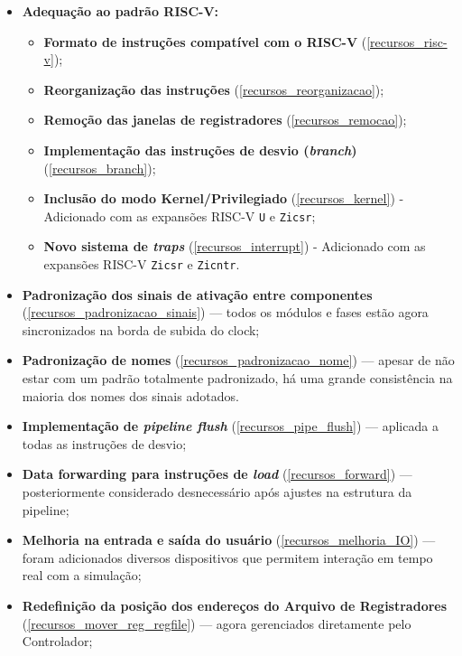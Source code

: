 \documentclass[
	12pt,				%
	openright,			%
	oneside,			%
	a4paper,			%
	english,			%
	french,				%
	spanish,			%
	brazil,				%
	]{abntex2}
\begin{document}
\begin{itemize}
    \item \textbf{Adequação ao padrão RISC-V:}
    \begin{itemize}
        \item \textbf{Formato de instruções compatível com o RISC-V} (\ref{recursos_risc-v});
        \item \textbf{Reorganização das instruções} (\ref{recursos_reorganizacao});
        \item \textbf{Remoção das janelas de registradores} (\ref{recursos_remocao});
        \item \textbf{Implementação das instruções de desvio (\textit{branch})} (\ref{recursos_branch});
        \item \textbf{Inclusão do modo Kernel/Privilegiado} (\ref{recursos_kernel}) - Adicionado com as expansões RISC-V \texttt{U} e \texttt{Zicsr};
        \item \textbf{Novo sistema de \textit{traps}} (\ref{recursos_interrupt}) - Adicionado com as expansões RISC-V \texttt{Zicsr} e \texttt{Zicntr}.
    \end{itemize}

    \item \textbf{Padronização dos sinais de ativação entre componentes} (\ref{recursos_padronizacao_sinais}) — todos os módulos e fases estão agora sincronizados na borda de subida do clock;

    \item \textbf{Padronização de nomes} (\ref{recursos_padronizacao_nome}) — apesar de não estar com um padrão totalmente padronizado, há uma grande consistência na maioria dos nomes dos sinais adotados.

    \item \textbf{Implementação de \textit{pipeline flush}} (\ref{recursos_pipe_flush}) — aplicada a todas as instruções de desvio;

    \item \textbf{Data forwarding para instruções de \textit{load}} (\ref{recursos_forward}) — posteriormente considerado desnecessário após ajustes na estrutura da pipeline;

    \item \textbf{Melhoria na entrada e saída do usuário} (\ref{recursos_melhoria_IO}) — foram adicionados diversos dispositivos que permitem interação em tempo real com a simulação;

    \item \textbf{Redefinição da posição dos endereços do Arquivo de Registradores} (\ref{recursos_mover_reg_regfile}) — agora gerenciados diretamente pelo Controlador;


\end{itemize}
\end{document}
